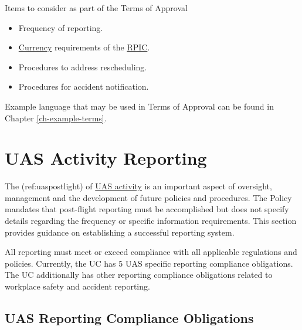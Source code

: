 \documentclass[
]{book}
\providecommand{\tightlist}{%
  \setlength{\itemsep}{0pt}\setlength{\parskip}{0pt}}
\begin{document}
Items to consider as part of the Terms of Approval

\begin{itemize}
\tightlist
\item
  Frequency of reporting.
\item
  \protect\hyperlink{currency}{Currency} requirements of the \protect\hyperlink{RPIC}{RPIC}.
\item
  Procedures to address rescheduling.
\item
  Procedures for accident notification.
\end{itemize}

Example language that may be used in Terms of Approval can be found in Chapter \ref{ch-example-terms}.

\hypertarget{ch-reporting}{%
\chapter{UAS Activity Reporting}\label{ch-reporting}}

The (ref:uaspostlight) of \protect\hyperlink{UASactivity}{UAS activity} is an important aspect of oversight, management and the development of future policies and procedures. The Policy mandates that post-flight reporting must be accomplished but does not specify details regarding the frequency or specific information requirements. This section provides guidance on establishing a successful reporting system.

All reporting must meet or exceed compliance with all applicable regulations and policies. Currently, the UC has 5 UAS specific reporting compliance obligations. The UC additionally has other reporting compliance obligations related to workplace safety and accident reporting.

\hypertarget{s-reporting-compliance}{%
\section{UAS Reporting Compliance Obligations}\label{s-reporting-compliance}}
\end{document}

